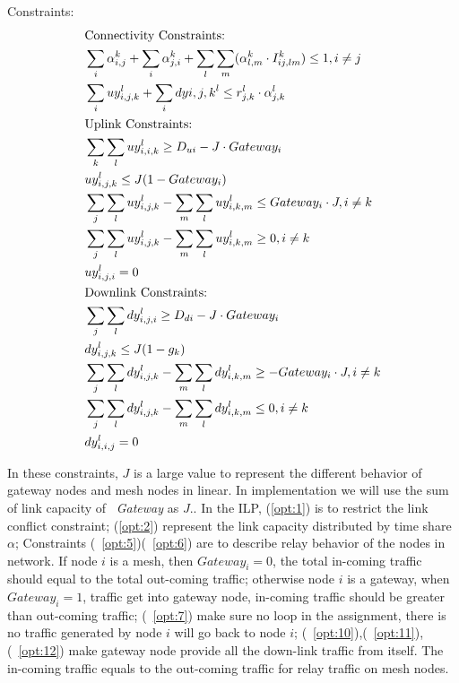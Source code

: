 Constraints:
\begin{align}
& \text{Connectivity Constraints:} \notag \\
\label{opt:1}
& \sum_i \alpha_{i,j}^k + \sum_i \alpha_{j,i}^k + \sum_l\sum_m(\alpha_{l,m}^k \cdot I_{ij,lm}^k) \leq 1, i\neq j \\
\label{opt:2}
& \sum_i uy_{i,j,k}^l + \sum_i dy{i,j,k}^l \leq r_{j,k}^l \cdot \alpha_{j,k}^l \\
& \text{Uplink Constraints:}\notag \\
\label{opt:3}
& \sum_k \sum_l uy_{i,i,k}^l \geq D_{ui} - J\cdot Gateway_i \\
\label{opt:4}
& uy_{i,j,k}^l \leq J(1-Gateway_i) \\
\label{opt:5}
& \sum_j\sum_l uy_{i,j,k}^l - \sum_m\sum_l uy_{i,k,m}^l \leq Gateway_i \cdot J , i \neq k\\
\label{opt:6}
& \sum_j\sum_l uy_{i,j,k}^l - \sum_m \sum_l uy_{i,k,m}^l \geq 0, i \neq k\\
\label{opt:7}
& uy_{i,j,i}^l=0\\
& \text{Downlink Constraints:}\notag \\
\label{opt:8}
& \sum_j \sum_l dy_{i,j,i}^l \geq D_{di} - J\cdot Gateway_i \\
\label{opt:9}
& dy_{i,j,k}^l \leq J(1-g_k) \\
\label{opt:10}
& \sum_j\sum_l dy_{i,j,k}^l - \sum_m\sum_l dy_{i,k,m}^l \geq -Gateway_i \cdot J, i \neq k\\
\label{opt:11}
& \sum_j\sum_l dy_{i,j,k}^l - \sum_m \sum_l dy_{i,k,m}^l \leq 0, i \neq k\\
\label{opt:12}
& dy_{i,i,j}^l=0
\end{align}

In these constraints, $J$ is a large value to represent the different behavior of gateway nodes and mesh nodes in linear. In implementation we will use the sum of link capacity of ~\emph{Gateway} as $J$..
In the ILP, (\ref{opt:1}) is to restrict the link conflict constraint; (\ref{opt:2}) represent the link capacity distributed by time share $\alpha$; 
Constraints (~\ref{opt:5})(~\ref{opt:6}) are to describe relay behavior of the nodes in network. If node $i$ is a mesh, then $Gateway_i=0$, the total in-coming traffic should equal to the total out-coming traffic; 
otherwise node $i$ is a gateway, when $Gateway_i=1$, traffic get into gateway node, in-coming traffic should be greater than out-coming traffic;
(~\ref{opt:7}) make sure no loop in the assignment, there is no traffic generated by node $i$ will go back to node $i$;
(~\ref{opt:10}),(~\ref{opt:11}),(~\ref{opt:12})
 make gateway node provide all the down-link traffic from itself. The in-coming traffic equals to the out-coming traffic for relay traffic on mesh nodes.



